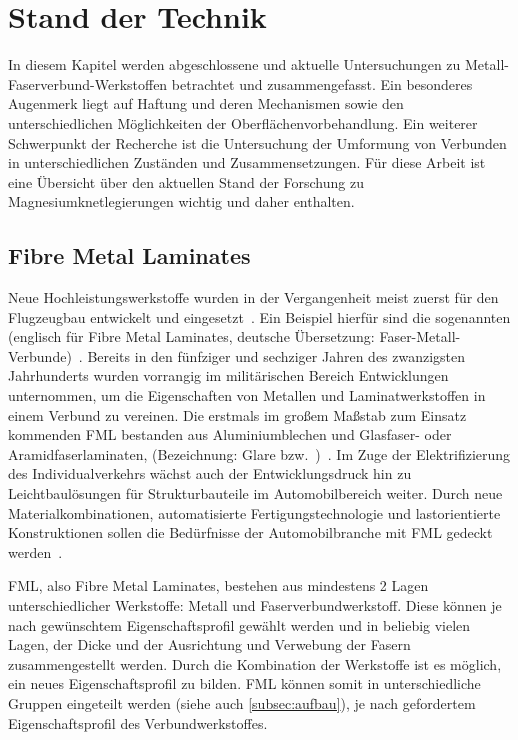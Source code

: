 \chapter{Stand der Technik}\label{ch:stand}

In diesem Kapitel werden abgeschlossene und aktuelle Untersuchungen zu Metall-Faserverbund-Werkstoffen betrachtet und zusammengefasst.
Ein besonderes Augenmerk liegt auf Haftung und deren Mechanismen sowie den unterschiedlichen Möglichkeiten der Oberflächenvorbehandlung.
Ein weiterer Schwerpunkt der Recherche ist die Untersuchung der Umformung von Verbunden in unterschiedlichen Zuständen und Zusammensetzungen.
Für diese Arbeit ist eine Übersicht über den aktuellen Stand der Forschung zu Magnesiumknetlegierungen wichtig und daher enthalten.

\section{Fibre Metal Laminates}\label{sec:FML}

Neue Hochleistungswerkstoffe wurden in der Vergangenheit meist zuerst für den Flugzeugbau entwickelt und eingesetzt~\cite{Wu2005}.
Ein Beispiel hierfür sind die sogenannten  (englisch für Fibre Metal Laminates, deutsche Übersetzung: Faser-Metall-Verbunde)~.
Bereits in den fünfziger und sechziger Jahren des zwanzigsten Jahrhunderts wurden vorrangig im militärischen Bereich Entwicklungen unternommen, um die Eigenschaften von Metallen und Laminatwerkstoffen in einem Verbund zu vereinen.
Die erstmals im großem Maßstab zum Einsatz kommenden FML bestanden aus Aluminiumblechen und Glasfaser- oder Aramidfaserlaminaten, (Bezeichnung: Glare bzw.\ )~\cite{Vogelesang2000}.
Im Zuge der Elektrifizierung des Individualverkehrs wächst auch der Entwicklungsdruck hin zu Leichtbaulösungen für Strukturbauteile im Automobilbereich weiter.
Durch neue Materialkombinationen, automatisierte Fertigungstechnologie und lastorientierte Konstruktionen sollen die Bedürfnisse der Automobilbranche mit FML gedeckt werden~\cite{Wollmann2018}.

FML, also Fibre Metal Laminates, bestehen aus mindestens 2 Lagen unterschiedlicher Werkstoffe: Metall und Faserverbundwerkstoff.
Diese können je nach gewünschtem Eigenschaftsprofil gewählt werden und in beliebig vielen Lagen, der Dicke und der Ausrichtung und Verwebung der Fasern zusammengestellt werden.
Durch die Kombination der Werkstoffe ist es möglich, ein neues Eigenschaftsprofil zu bilden.
FML können somit in unterschiedliche Gruppen eingeteilt werden (siehe auch \autoref{subsec:aufbau}), je nach gefordertem Eigenschaftsprofil des Verbundwerkstoffes.

